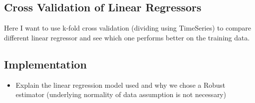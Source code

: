 \subsection{Cross Validation of Linear Regressors}
Here I want to use k-fold cross validation (dividing using TimeSeries) to compare different linear regressor and see which one performs better on the training data.

\subsection{Implementation}

\begin{itemize}
	\item Explain the linear regression model used and why we chose a Robust estimator (underlying normality of data assumption is not necessary)
\end{itemize}


